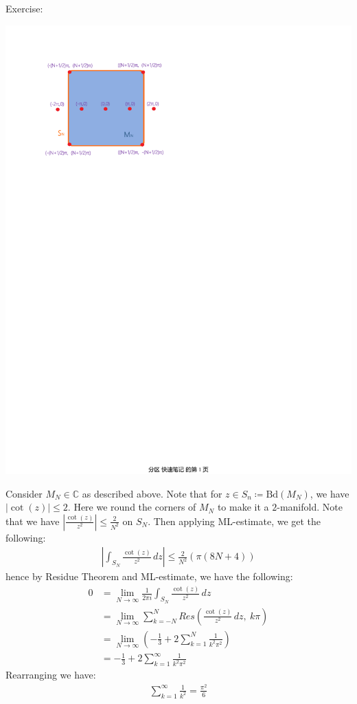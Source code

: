 \documentclass[11pt,oneside]{book}
\theoremstyle{break}
\theoremstyle{break}
\newcommand{\Complex}{\mathbb{C}}
\newcommand{\Bd}{\text{Bd}}
\newcommand{\exercise}{\color{green}Exercise: \color{black}}
\begin{document}
\exercise
\begin{center}
\includegraphics[scale=0.8]{MNSN.pdf}
\end{center}
Consider $M_N \in \Complex$ as described above. Note that for $z \in S_n \coloneqq \Bd(M_N)$,  we have $|\cot(z)|\leq 2$. Here we round the corners of $M_N$ to make it a $2$-manifold. Note that we have $|\frac{\cot(z)}{z^2}|\leq \frac{2}{N^2}$ on $S_N$. Then applying ML-estimate, we get the following:
\begin{align*}
\left| \int_{S_N}\frac{\cot(z)}{z^2}\, dz \right| \leq \frac{2}{N^2} \left( \pi (8N+4)\right)
\end{align*}
hence by Residue Theorem and ML-estimate, we have the following:
\begin{align*}
0&=\lim_{N\to \infty} \frac{1}{2\pi i}\int_{S_N}\frac{\cot(z)}{z^2}\, dz \\
&= \lim_{N\to \infty}\sum_{k=-N}^{N}Res\left( \frac{\cot(z)}{z^2}\, dz,\ k\pi\right) \\
&= \lim_{N\to \infty}\left( -\frac{1}{3}+ 2\sum_{k=1}^N \frac{1}{k^2 \pi^2}\right) \\
&= -\frac{1}{3}+2\sum_{k=1}^{\infty}\frac{1}{k^2 \pi^2}
\end{align*}
Rearranging we have:
\begin{align*}
\sum_{k=1}^\infty \frac{1}{k^2} = \frac{\pi^2}{6}
\end{align*}
\end{document}
